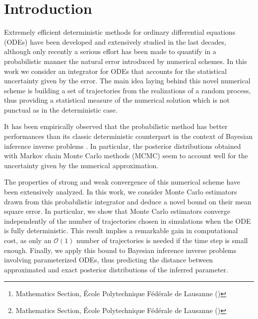 \documentclass{siamart1116}
\title{{\TheTitle}}
\author{Assyr Abdulle\thanks{Mathematics Section, \'Ecole Polytechnique F\'ed\'erale de Lausanne (\email{assyr.abdulle@epfl.ch})}
	\and
	Giacomo Garegnani\thanks{Mathematics Section, \'Ecole Polytechnique F\'ed\'erale de Lausanne (\email{giacomo.garegnani@epfl.ch})}}
\numberwithin{theorem}{section}
\newcommand{\OO}{\mathcal{O}}
\begin{document}
	
\maketitle

\begin{abstract} We consider a probabilistic integrator for ordinary differential equations (ODEs) which has recently been introduced \cite{CGS16}. The existing analysis of strong and weak convergence is integrated in this work with a novel bound on the mean square error (MSE) of estimators obtained with Monte Carlo simulations. Exploiting this result, we deduce a result of convergence of the posterior distribution in the frame of Bayesian inverse problems involving parameterized ODEs.	
\end{abstract}

\section{Introduction} Extremely efficient deterministic methods for ordinary differential equations (ODEs) have been developed and extensively studied in the last decades, although only recently a serious effort has been made to quantify in a probabilistic manner the natural error introduced by numerical schemes. In this work we consider an integrator \cite{CGS16} for ODEs that accounts for the statistical uncertainty given by the error. The main idea laying behind this novel numerical scheme is building a set of trajectories from the realizations of a random process, thus providing a statistical measure of the numerical solution which is not punctual as in the deterministic case.

It has been empirically observed that the probabilistic method has better performances than its classic deterministic counterpart in the context of Bayesian inference inverse problems \cite{CGS16}. In particular, the posterior distributions obtained with Markov chain Monte Carlo methods (MCMC) seem to account well for the uncertainty given by the numerical approximation.

The properties of strong and weak convergence of this numerical scheme have been extensively analyzed. In this work, we consider Monte Carlo estimators drawn from this probabilistic integrator and deduce a novel bound on their mean square error. In particular, we show that Monte Carlo estimators converge independently of the number of trajectories chosen in simulations when the ODE is fully deterministic. This result implies a remarkable gain in computational cost, as only an $\OO(1)$ number of trajectories is needed if the time step is small enough. Finally, we apply this bound to Bayesian inference inverse problems involving parameterized ODEs, thus predicting the distance between approximated and exact posterior distributions of the inferred parameter.
\end{document}
